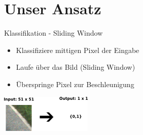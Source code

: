\section{Unser Ansatz}

\begin{frame}{Klassifikation - Sliding Window}
\begin{minipage}{0.59\textwidth}
\begin{itemize}
\item Klassifiziere mittigen Pixel der Eingabe \\
\item Laufe über das Bild (Sliding Window) \\
\item Überspringe Pixel zur Beschleunigung
\end{itemize}
\end{minipage}
\begin{minipage}{0.39\textwidth}
	\flushright
      \includegraphics[]{../images/models/sliding_window.png}
\end{minipage}


\end{frame}

